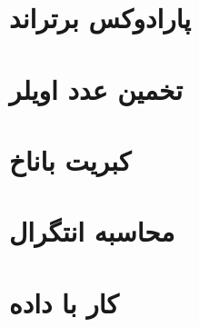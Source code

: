 \documentclass[14pt]{extarticle}
\begin{document}
	
	\tableofcontents
	\clearpage
	\section{پارادوکس برتراند}
	\newpage\section{تخمین عدد اویلر}
	\newpage\section{کبریت باناخ}
	\newpage\section{محاسبه انتگرال}
	\newpage\section{کار با داده}
\end{document}
